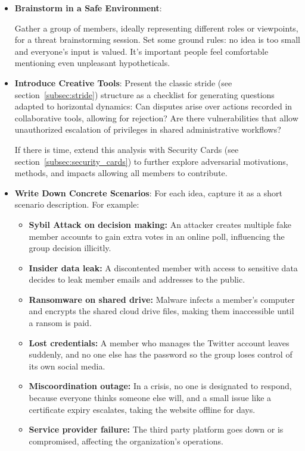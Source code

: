 \begin{itemize}

    \item \textbf{Brainstorm in a Safe Environment}:
    
    Gather a group of members, ideally representing different roles or viewpoints,
    for a threat brainstorming session. Set some ground rules: no idea is
    too small and everyone's input is valued. It's important
    people feel comfortable mentioning even unpleasant hypotheticals.

    \item \textbf{Introduce Creative Tools}: Present the classic \gls{stride}
    (see section~\ref{subsec:stride}) structure as a checklist for generating
    questions adapted to horizontal dynamics: Can disputes arise over actions recorded in
    collaborative tools, allowing for rejection? Are there vulnerabilities that
    allow unauthorized escalation of privileges in shared administrative workflows?

    If there is time, extend this analysis with Security Cards (see section~\ref{subsec:security_cards})
    to further explore adversarial motivations, methods, and impacts allowing all members to contribute.

    \item \textbf{Write Down Concrete Scenarios}:
    For each idea, capture it as a short scenario description.
    For example:

    \begin{itemize}
        \item \textbf{Sybil Attack on decision making:} An attacker creates multiple fake member
        accounts to gain extra votes in an online poll, influencing the group decision illicitly.
        \item \textbf{Insider data leak:} A discontented member with access to sensitive data decides
        to leak member emails and addresses to the public.
        \item \textbf{Ransomware on shared drive:} Malware infects a member's computer and encrypts the
        shared cloud drive files, making them inaccessible until a ransom is paid.
        \item \textbf{Lost credentials:} A member who manages the Twitter account leaves suddenly, and
        no one else has the password so the group loses control of its own social media.
        \item \textbf{Miscoordination outage:} In a crisis, no one is designated to respond, because everyone
        thinks someone else will, and a small issue like a certificate expiry escalates, taking the website
        offline for days.
        \item \textbf{Service provider failure:} The third party platform goes
        down or is compromised, affecting the organization's operations.
    \end{itemize}


\end{itemize}
